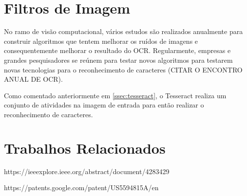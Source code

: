 \section{Filtros de Imagem}
No ramo de visão computacional, vários estudos são realizados anualmente para construir algoritmos que tentem melhorar os ruídos de imagens e consequentemente melhorar o resultado do OCR. Regularmente, empresas e grandes pesquisadores se reúnem para testar novos algoritmos para testarem novas tecnologias para o reconhecimento de caracteres (CITAR O ENCONTRO ANUAL DE OCR).

Como comentado anteriormente em \ref{ssec:tesseract}, o Tesseract realiza um conjunto de atividades na imagem de entrada para então realizar o reconhecimento de caracteres.

\section{Trabalhos Relacionados}

https://ieeexplore.ieee.org/abstract/document/4283429

https://patents.google.com/patent/US5594815A/en

